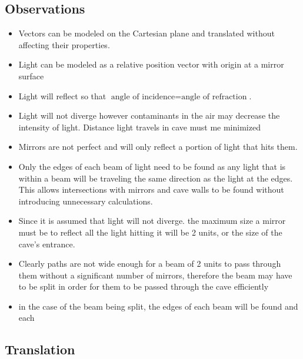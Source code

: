 \documentclass[11pt, letterpaper]{article}
\begin{document}
\subsection{Observations}
\par
\begin{itemize}
\item Vectors can be modeled on the Cartesian plane and translated without affecting their properties. 

\item Light can be modeled as a relative position vector with origin at a mirror surface

\item Light will reflect so that $\textrm{angle  of incidence} = \textrm{angle of refraction}$.

\item Light will not diverge however contaminants in the air may decrease the intensity of light. Distance light travels in cave must me minimized

\item Mirrors are not perfect and will only reflect a portion of light that hits them. 

\item Only the edges of each beam of light need to be found as any light that is within a beam will be traveling the same direction as the light at the edges. This allows intersections with mirrors and cave walls to be found without introducing unnecessary calculations. 

\item  Since it is assumed that light will not diverge. the maximum size a mirror must be to reflect all the light hitting it will be 2 units, or the size of the cave's entrance. 

\item Clearly paths are not wide enough for a beam of 2 units to pass through them without a significant number of mirrors, therefore the beam may have to be split in order for them to be passed through the cave efficiently 

\item in the case of the beam being split, the edges of each beam will be found and each 

\end{itemize}





\subsection{Translation}
\par 
\end{document}
